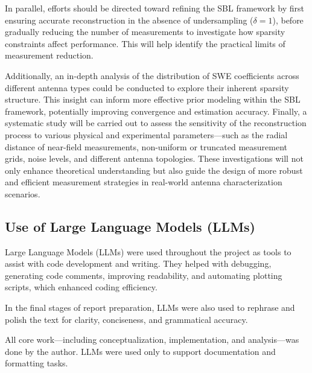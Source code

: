 \documentclass{article}
\begin{document}
In parallel, efforts should be directed toward refining the SBL framework by first ensuring accurate reconstruction in the absence of undersampling ($\delta = 1$), before gradually reducing the number of measurements to investigate how sparsity constraints affect performance. This will help identify the practical limits of measurement reduction.

Additionally, an in-depth analysis of the distribution of SWE coefficients across different antenna types could be conducted to explore their inherent sparsity structure. This insight can inform more effective prior modeling within the SBL framework, potentially improving convergence and estimation accuracy. Finally, a systematic study will be carried out to assess the sensitivity of the reconstruction process to various physical and experimental parameters—such as the radial distance of near-field measurements, non-uniform or truncated measurement grids, noise levels, and different antenna topologies. These investigations will not only enhance theoretical understanding but also guide the design of more robust and efficient measurement strategies in real-world antenna characterization scenarios.

\subsection{Use of Large Language Models (LLMs)} 
Large Language Models (LLMs) were used throughout the project as tools to assist with code development and writing. They helped with debugging, generating code comments, improving readability, and automating plotting scripts, which enhanced coding efficiency. 

In the final stages of report preparation, LLMs were also used to rephrase and polish the text for clarity, conciseness, and grammatical accuracy. 

All core work—including conceptualization, implementation, and analysis—was done by the author. LLMs were used only to support documentation and formatting tasks.


\end{document}
